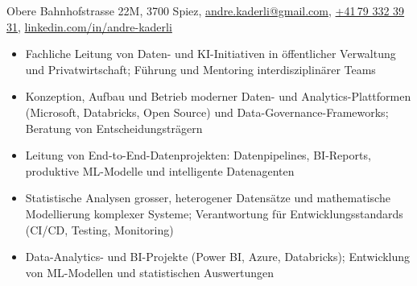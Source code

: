 \documentclass{template}
\begin{document}
	\begin{contactline}
		Obere Bahnhofstrasse 22M, 3700 Spiez\sep
		\href{mailto:andre.kaderli@gmail.com}{andre.kaderli@gmail.com}\sep
		\href{tel:+41793323931}{+41\,79 332 39 31}\sep
		\href{https://www.linkedin.com/in/andre-kaderli/}{linkedin.com/in/andre-kaderli}
	\end{contactline}



	\begin{itemize}
		\item Fachliche Leitung von Daten- und KI-Initiativen in öffentlicher Verwaltung und Privatwirtschaft; Führung und Mentoring interdisziplinärer Teams
		\item Konzeption, Aufbau und Betrieb moderner Daten- und Analytics-Plattformen (Microsoft, Databricks, Open Source) und Data-Governance-Frameworks; Beratung von Entscheidungsträgern
	\end{itemize}

	\begin{itemize}
		\item Leitung von End-to-End-Datenprojekten: Datenpipelines, BI-Reports, produktive ML-Modelle und intelligente Datenagenten
		\item Statistische Analysen grosser, heterogener Datensätze und mathematische Modellierung komplexer Systeme; Verantwortung für Entwicklungsstandards (CI/CD, Testing, Monitoring)
	\end{itemize}

	\begin{itemize}
		\item Data-Analytics- und BI-Projekte (Power BI, Azure, Databricks); Entwicklung von ML-Modellen und statistischen Auswertungen
	\end{itemize}
\end{document}
